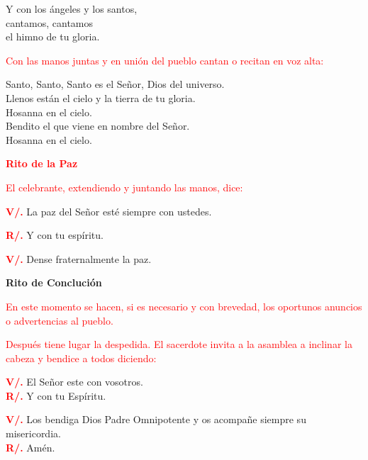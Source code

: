 \documentclass[12pt, letterpaper]{report}
\begin{document}
\noindent
\Large Y con los \'angeles y los santos,\\
cantamos, cantamos\\
el himno de tu gloria.
    
\large{\textcolor{red}{Con las manos juntas y en uni\'on del pueblo cantan o recitan en voz alta:}}

\noindent
\Large {Santo, Santo, Santo es el Se\~nor, Dios del universo.\\
Llenos est\'an el cielo y la tierra de tu gloria.\\
Hosanna en el cielo.\\
Bendito el que viene en nombre del Se\~nor.\\
Hosanna en el cielo.}

\Large {\bfseries \textcolor{red}{Rito de la Paz}}

\large {\textcolor{red}{El celebrante, extendiendo y juntando las manos, dice:}}

\noindent
\Large {\bfseries \textcolor{red}{V/.}} \hspace{0.5cm} La paz del Se\~nor est\'e siempre con ustedes.

\noindent
\Large {\bfseries \textcolor{red}{R/.}} \hspace{0.5cm} Y con tu esp\'iritu. 

\noindent
\Large {\bfseries \textcolor{red}{V/.}} \hspace{0.5cm} Dense fraternalmente la paz. 

\newpage

\begin{center}
\Huge {\bfseries Rito de Concluci\'on}
\end{center}

\large{\textcolor{red}{En este momento se hacen, si es necesario y con brevedad, los oportunos anuncios o advertencias al pueblo.}}

\large{\textcolor{red}{Despu\'es tiene lugar la despedida. El sacerdote invita a la asamblea a inclinar la cabeza y bendice a todos diciendo:}}

\noindent
\Large {\bfseries \textcolor{red}{V/.}} \hspace{0.5cm} El Se\~nor este con vosotros.\\
\noindent
\Large {\bfseries \textcolor{red}{R/.}} \hspace{0.5cm} Y con tu Esp\'iritu.

\noindent
\Large {\bfseries \textcolor{red}{V/.}} \hspace{0.5cm} Los bendiga Dios Padre Omnipotente y os acompa\~ne siempre su misericordia.\\
\noindent
\Large {\bfseries \textcolor{red}{R/.}} \hspace{0.5cm} Am\'en.
\end{document}
